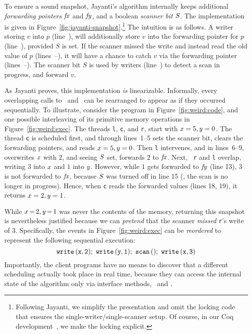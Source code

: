 

To ensure a sound snapshot, Jayanti's algorithm internally keeps
additional \emph{forwarding pointers} $\mathit{fx}$ and $\mathit{fy}$, and a boolean
\emph{scanner bit} $S$. The implementation is given in
Figure~\ref{fig:jayanti-snapshot}.\footnote{Following Jayanti, we
  simplify the presentation and omit the locking code that ensures the
  single-writer/single-scanner setup. Of course, in our Coq
  development~\cite{CoqFiles}, we make the locking explicit.}
%
The intuition is as follows. A writer storing $v$ into $p$
(line~\lineWrtWrt), will additionally store $v$ into the forwarding
pointer for $p$ (line~\lineWrtFwd), provided $S$ is set. If the
scanner missed the write and instead read the old value of $p$
(lines~\lineScanReadsX--\lineScanReadsY), it will have a chance to
catch $v$ via the forwarding pointer
(lines~\lineScanReadsFX--\lineScanReadsFY). The scanner bit $S$ is
used by writers (line~\lineWrtChk) to detect a scan in progress, and
forward $v$.


 
As Jayanti proves, this implementation \emph{is} linearizable. Informally,
every overlapping calls to \jywrite~and \jyscan~can be rearranged to
appear as if they occurred sequentially.  To illustrate, consider the
program in Figure~\ref{fig:weird:code}, and one possible interleaving
of its primitive memory operations in Figure~\ref{fig:weird:exec}. The
threads {\tt l}, {\tt c}, and {\tt r}, start with $x = 5, y = 0$.
%
The thread {\tt c} is scheduled first, and through lines~1--5 sets the
scanner bit, clears the forwarding pointers, and reads $x = 5, y =
0$. Then {\tt l} intervenes, and in lines~6--9, overwrites
$x$ with $2$, and seeing $S$ set, forwards $2$ to $\mathit{fx}$. Next, {\tt
  r} and {\tt l} overlap, writing $3$ into $x$ and $1$ into
$y$. However, while $1$ gets forwarded to $\mathit{fy}$ (line 13), $3$ is not
forwarded to $\mathit{fx}$, because $S$ was turned off in line 15 (\ie, the
scan is no longer in progress). Hence, when {\tt c} reads the
forwarded values (lines 18, 19), it returns $x = 2, y = 1$.

While $x\,{=}\,2, y\,{=}\,1$ was never the contents of the memory,
returning this snapshot is nevertheless justified because we can
\emph{pretend} that the scanner \emph{missed} {\tt r}'s write of
$3$. Specifically, the events in Figure~\ref{fig:weird:exec} can be
\emph{reordered} to represent the following sequential execution:
%
\begin{equation}
\hfill \mathtt{write\, (x, 2);\ write\, (y,1);\ scan\, ();\ write\, (x,
  3)}\hfill \label{eq:lin}
\end{equation}
%
Importantly, the client programs have no means to discover that a
different scheduling actually took place in real time, because they
can access the internal state of the algorithm only via interface
methods, \jywrite~and \jyscan.

